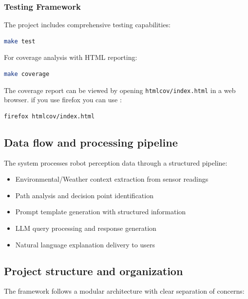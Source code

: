 \subsubsection{Testing Framework}

The project includes comprehensive testing capabilities:

\begin{lstlisting}[language=bash]
    make test
\end{lstlisting}
For coverage analysis with HTML reporting:

\begin{lstlisting}[language=bash]
    make coverage
\end{lstlisting}
The coverage report can be viewed by opening \texttt{htmlcov/index.html} in a web browser.
if you use firefox you can use :
\begin{lstlisting}[language=bash]
    firefox htmlcov/index.html
\end{lstlisting}

\subsection{Data flow and processing pipeline}

The system processes robot perception data through a structured pipeline:
\begin{itemize}
    \item Environmental/Weather context extraction from sensor readings
    \item Path analysis and decision point identification
    \item Prompt template generation with structured information
    \item LLM query processing and response generation
    \item Natural language explanation delivery to users
\end{itemize}


\subsection{Project structure and organization}

The framework follows a modular architecture with clear separation of concerns:

